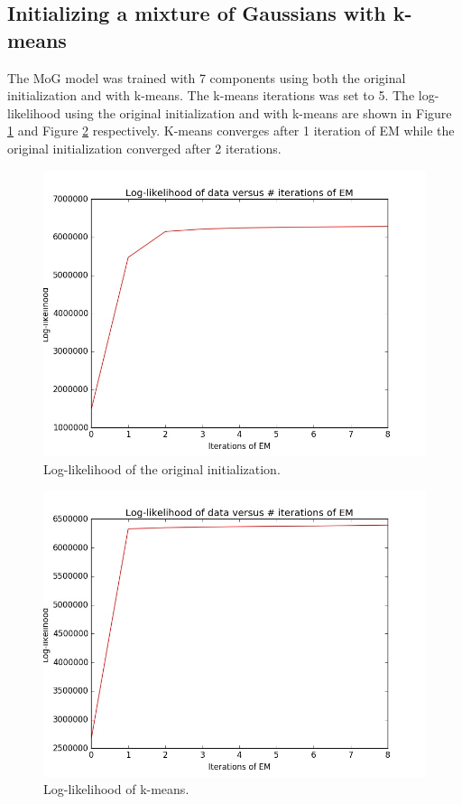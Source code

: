 \documentclass[12pt]{article}
\begin{document}
\subsection{Initializing a mixture of Gaussians with k-means}

The MoG model was trained with 7 components using both the original initialization and with k-means. The k-means iterations was set to 5. The log-likelihood using the original initialization and with k-means are shown in Figure \ref{f43a} and Figure \ref{f43b} respectively. K-means converges after 1 iteration of EM while the original initialization converged after 2 iterations. 

\begin{figure}[!htb]
\centering
\includegraphics[width=0.6\linewidth]{43/original.jpg}
\vspace{-0.1in}
\caption{Log-likelihood of the original initialization.}
\label{f43a}
\vspace{-0.1in}
\end{figure}

\begin{figure}[!htb]
\centering
\includegraphics[width=0.6\linewidth]{43/kmeans.jpg}
\vspace{-0.1in}
\caption{Log-likelihood of k-means.}
\label{f43b}
\vspace{-0.1in}
\end{figure}
\end{document}
